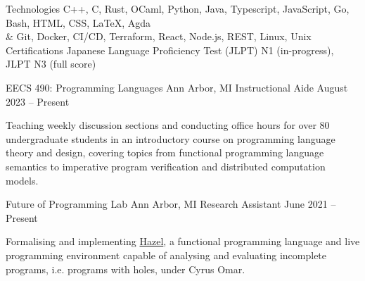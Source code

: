 \documentclass[letterpaper,11pt]{article}
\begin{document}
  \begin{rlinelist}
    \rline
      {Technologies}
      {C++, C, Rust, OCaml, Python, Java, Typescript, JavaScript, Go, Bash, HTML, CSS, \LaTeX, Agda \\
        & Git, Docker, CI/CD, Terraform, React, Node.js, REST, Linux, Unix}
    \rline
      {Certifications}
      {Japanese Language Proficiency Test (JLPT) N1 (in-progress), JLPT N3 (full score)}
  \end{rlinelist}

  \begin{rsectionlist}
    \rsectionitem
      {EECS 490: Programming Languages}
      {Ann Arbor, MI}
      {Instructional Aide}
      {August 2023 -- Present}

      Teaching weekly discussion sections and conducting office hours for over 80 undergraduate
      students in an introductory course on programming language theory and design, covering topics
      from functional programming language semantics to imperative program verification and
      distributed computation models.

    \rsectionitem
      {Future of Programming Lab}
      {Ann Arbor, MI}
      {Research Assistant}
      {June 2021 -- Present}
      
      Formalising and implementing \href{https://hazel.org}{Hazel}, a functional programming
      language and live programming environment capable of analysing and evaluating incomplete
      programs, i.e. programs with holes, under Cyrus Omar.

      \begin{rpointlist}
      \end{rpointlist}


\end{rsectionlist}
\end{document}

